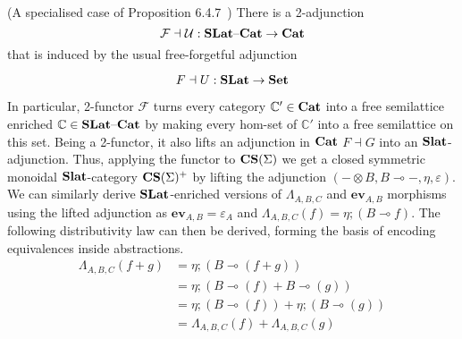     \begin{proposition}(A specialised case of Proposition 6.4.7~\cite{Borceux_1994})
        There is a 2-adjunction 
        \vspace{-1mm}
        \[
        \mathcal{F} \dashv \mathcal{U} : \catname{SLat}\text{--}\catname{Cat} \to \catname{Cat}
        \vspace{-1mm}
        \]
        that is induced by the usual free-forgetful adjunction 
        
        \vspace{-1mm}
        \[
        F \dashv U : \catname{SLat} \to \catname{Set}
        \vspace{-1mm}
        \]        
    \end{proposition}
In particular, 2-functor $\mathcal{F}$ turns every category $\mathbb{C'} \in \mathbf{Cat}$ into a free semilattice enriched $\mathbb{C} \in \mathbf{SLat}\text{--}\mathbf{Cat}$ by making every hom-set of $\mathbb{C'}$ into a free semilattice on this set.
Being a 2-functor, it also lifts an adjunction in $\mathbf{Cat}$ $F \dashv G$ into an $\mathbf{Slat}$-adjunction.
Thus, applying the functor to $\mathbf{CS}(\Sigma)$ we get a closed symmetric monoidal $\mathbf{Slat}$-category $\mathbf{CS}(\Sigma)^{+}$ by lifting the adjunction $(- \otimes B, B \multimap{} -, \eta, \varepsilon)$.
We can similarly derive $\mathbf{SLat}$-enriched versions of  $\Lambda_{A,B,C}$ and $\textbf{ev}_{A,B}$ morphisms using the lifted adjunction as $\textbf{ev}_{A,B} = \varepsilon_{A}$ and $\Lambda_{A,B,C}(f) = \eta; (B \multimap{} f)$.
The following distributivity law can then be derived, forming the basis of encoding equivalences inside abstractions.
\begin{equation}
\begin{aligned}
\Lambda_{A,B,C}(f + g) &= \eta;(B \multimap (f + g))\\
                       &= \eta;(B \multimap (f) + B \multimap (g))\\
                       &= \eta;(B \multimap (f)) + \eta;(B \multimap (g))\\
                       &= \Lambda_{A,B,C}(f) + \Lambda_{A,B,C}(g)
\end{aligned}
\end{equation}
\label{law:distributivity}

